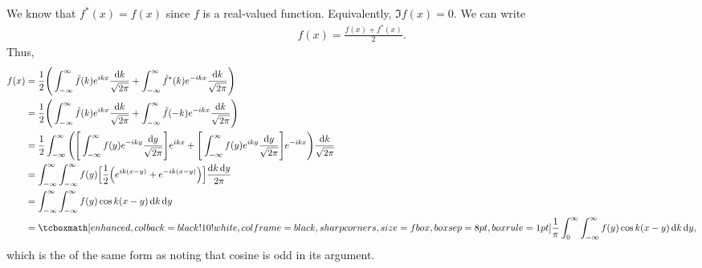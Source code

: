 \def\duedate{11/01/22}
\def\HWnum{5}



    

We know that $f^{*}(x) = f(x)$ since $f$ is a real-valued function.
Equivalently, $\Im f(x) = 0$.
We can write 
\begin{eqnarray}
    \label{eq:f-equiv}
    f(x) = \frac{f(x) + f^{*}(x)}{2} 
.\end{eqnarray}
Thus,
\begin{align}
    \label{eq:f-equiv-fourier}
    f(x) &= \frac{1}{2} \Bigg( \int_{-\infty}^{\infty} \tilde{f}(k) e^{ikx} \frac{\dd{k}}{\sqrt{2\pi}} + \int_{-\infty}^{\infty} \tilde{f}^{*}(k) e^{-ikx} \frac{\dd{k}}{\sqrt{2\pi}} \Bigg) \\
         &= \frac{1}{2} \Bigg( \int_{-\infty}^{\infty} \tilde{f}(k) e^{ikx} \frac{\dd{k}}{\sqrt{2\pi}} + \int_{-\infty}^{\infty} \tilde{f}(-k) e^{-ikx} \frac{\dd{k}}{\sqrt{2\pi}} \Bigg) \\
         &= \frac{1}{2} \int_{-\infty}^{\infty} \Bigg(\Bigg[ \int_{-\infty}^{\infty} f(y) e^{-iky} \frac{\dd{y}}{\sqrt{2\pi}} \Bigg] e^{ikx} + \Bigg[ \int_{-\infty}^{\infty} f(y) e^{iky} \frac{\dd{y}}{\sqrt{2\pi}} \Bigg] e^{-ikx} \Bigg) \frac{\dd{k}}{\sqrt{2\pi}} \\ 
         &= \int_{-\infty}^{\infty} \int_{-\infty}^{\infty} f(y) \Big[ \frac{1}{2}\Big( e^{ik(x-y)} + e^{-ik(x-y)} \Big) \Big] \frac{\dd{k}\dd{y}}{2\pi} \\
         &= \int_{-\infty}^{\infty} \int_{-\infty}^{\infty} f(y) \cos{k(x-y)} \dd{k}\dd{y} \\
         &= \eqbox{\frac{1}{\pi} \int_{0}^{\infty} \int_{-\infty}^{\infty} f(y) \cos{k(x-y)} \dd{k}\dd{y}}
,\end{align}
which is the of the same form as  noting that cosine is odd in its argument.

